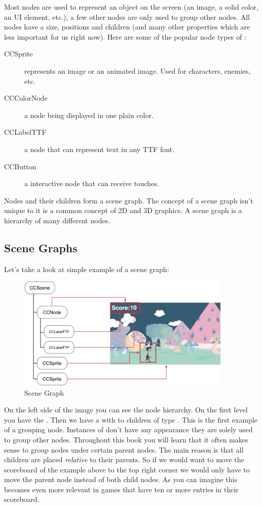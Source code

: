 Most nodes are used to represent an object on the screen (an image, a solid
color, an UI element, etc.), a few other nodes are only used to group other
nodes. All nodes have a size, positions and children (and many other properties
which are less important for us right now). Here are some of the popular
node types of \cocos{}:

\begin{description}
  \item[CCSprite] represents an image or an animated image. Used for characters,
  enemies, etc.
  \item[CCColorNode] a node being displayed in one plain color.
  \item[CCLabelTTF] a node that can represent text in any TTF font.
  \item[CCButton] a interactive node that can receive touches.
\end{description}

Nodes and their children form a scene graph. The concept of a scene graph isn't
unique to \cocos{} it is a common concept of 2D and 3D graphics. A scene graph
is a hierarchy of many different nodes. 

\subsection{Scene Graphs}
Let's take a look at simple example of a scene graph:

\begin{figure}[H]
		\centering
		\includegraphics[width=290pt]{images/cocos2d/SceneGraph.png}     
		\caption{\cocos{} Scene Graph}
\end{figure}

On the left side of the image you can see the node hierarchy. On the first level
you have the \ccscene{}. Then we have a \ccnode{} with to children of type
\cclabel{}. This \ccnode{} is the first example of a grouping node. Instances of
\ccnode{} don't have any appearance they are solely used to group other nodes.
Throughout this book you will learn that it often makes sense to group nodes
under certain parent nodes. The main reason is that all children are placed
\textit{relative} to their parents. So if we would want to move the scoreboard
of the example above to the top right corner we would only have to move the
parent node instead of both child nodes. As you can imagine this becomes
even more relevant in games that have ten or more entries in their scoreboard.

